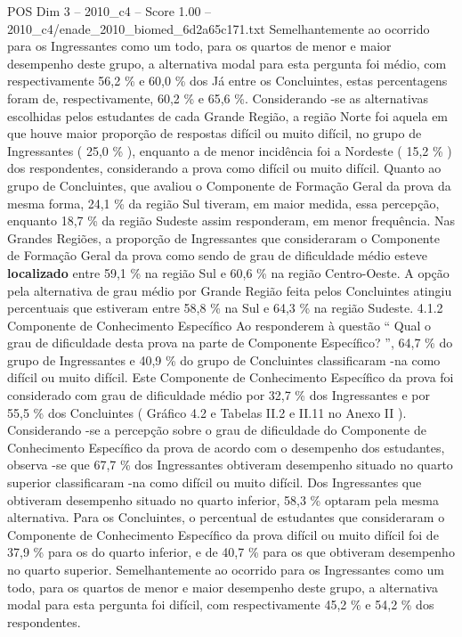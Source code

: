 \begin{textsample}{POS Dim 3 – 2010\_c4 – Score 1.00 – 2010\_c4/enade\_2010\_biomed\_6d2a65c171.txt}
Semelhantemente ao ocorrido para os Ingressantes como um todo, para os quartos de menor e maior desempenho deste grupo, a alternativa modal para esta pergunta foi médio, com respectivamente 56,2 \% e 60,0 \% dos Já entre os Concluintes, estas percentagens foram de, respectivamente, 60,2 \% e 65,6 \%.
Considerando -se as alternativas escolhidas pelos estudantes de cada Grande Região, a região Norte foi aquela em que houve maior proporção de respostas difícil ou muito difícil, no grupo de Ingressantes ( 25,0 \% ), enquanto a de menor incidência foi a Nordeste ( 15,2 \% ) dos respondentes, considerando a prova como difícil ou muito difícil.
Quanto ao grupo de Concluintes, que avaliou o Componente de Formação Geral da prova da mesma forma, 24,1 \% da região Sul tiveram, em maior medida, essa percepção, enquanto 18,7 \% da região Sudeste assim responderam, em menor frequência.
Nas Grandes Regiões, a proporção de Ingressantes que consideraram o Componente de Formação Geral da prova como sendo de grau de dificuldade médio esteve \textbf{localizado} entre 59,1 \% na região Sul e 60,6 \% na região Centro-Oeste.
A opção pela alternativa de grau médio por Grande Região feita pelos Concluintes atingiu percentuais que estiveram entre 58,8 \% na Sul e 64,3 \% na região Sudeste. 4.1.2 Componente de Conhecimento Específico Ao responderem à questão “ Qual o grau de dificuldade desta prova na parte de Componente Específico? ”, 64,7 \% do grupo de Ingressantes e 40,9 \% do grupo de Concluintes classificaram -na como difícil ou muito difícil.
Este Componente de Conhecimento Específico da prova foi considerado com grau de dificuldade médio por 32,7 \% dos Ingressantes e por 55,5 \% dos Concluintes ( Gráfico 4.2 e Tabelas II.2 e II.11 no Anexo II ).
Considerando -se a percepção sobre o grau de dificuldade do Componente de Conhecimento Específico da prova de acordo com o desempenho dos estudantes, observa -se que 67,7 \% dos Ingressantes obtiveram desempenho situado no quarto superior classificaram -na como difícil ou muito difícil.
Dos Ingressantes que obtiveram desempenho situado no quarto inferior, 58,3 \% optaram pela mesma alternativa.
Para os Concluintes, o percentual de estudantes que consideraram o Componente de Conhecimento Específico da prova difícil ou muito difícil foi de 37,9 \% para os do quarto inferior, e de 40,7 \% para os que obtiveram desempenho no quarto superior.
Semelhantemente ao ocorrido para os Ingressantes como um todo, para os quartos de menor e maior desempenho deste grupo, a alternativa modal para esta pergunta foi difícil, com respectivamente 45,2 \% e 54,2 \% dos respondentes.

\end{textsample}
